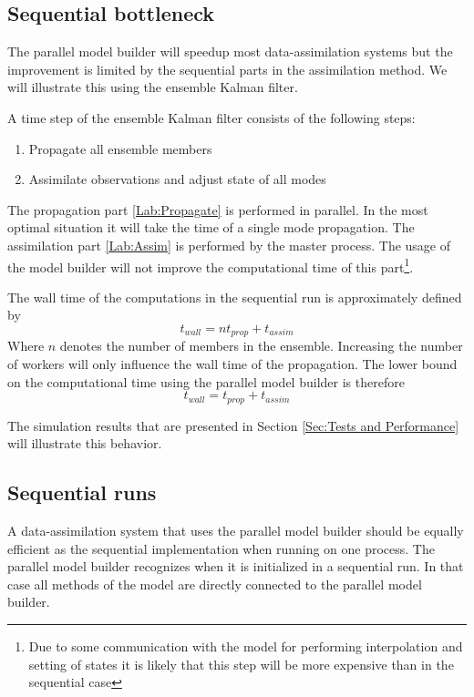 \subsection{Sequential bottleneck}
The parallel model builder will speedup most data-assimilation systems but
the improvement is limited by the sequential parts in the assimilation
method. We will illustrate this using the ensemble Kalman filter. 

A time step of the ensemble Kalman filter consists of the following steps:
\begin{enumerate}
\item \label{Lab:Propagate} Propagate all ensemble members
\item \label{Lab:Assim} Assimilate observations and adjust state of all modes
\end{enumerate}

The propagation part \ref{Lab:Propagate} is performed in parallel. In the
most optimal situation it will take the time of a single mode propagation.
The assimilation part \ref{Lab:Assim} is performed by the master process.
The usage of the model builder will not improve the computational time of
this part\footnote{Due to some communication with the model for performing
interpolation and setting of states it is likely that this step will be
more expensive than in the sequential case}.

The wall time of the computations in the sequential run is approximately
defined by
\begin{equation}
t_{wall}=n t_{prop} + t_{assim}
\end{equation}
Where $n$ denotes the number of members in the ensemble. Increasing the
number of workers will only influence the wall time of the propagation. The
lower bound on the computational time using the parallel model builder is
therefore
\begin{equation}
t_{wall}=t_{prop} + t_{assim}
\end{equation}

The simulation results that are presented in Section \ref{Sec:Tests and
Performance} will illustrate this behavior.

\subsection{Sequential runs}
A data-assimilation system that uses the parallel model builder should be
equally efficient as the sequential implementation when running on one
process. The parallel model builder recognizes when it is initialized in a
sequential run. In that case all methods of the model are directly
connected to the parallel model builder.

